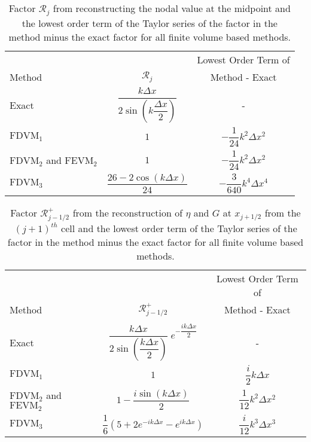 \begin{table}
	\centering
	\begin{tabular}{l  c  c}
		&&Lowest Order Term of	\\
		Method& $\mathcal{R}_j$& Method - Exact  \B \\
		\hline 
		Exact &$\dfrac{k\Delta x}{2 \sin \left(k\dfrac{\Delta x}{2}\right)}$ & - \T \B \\
		$\text{FDVM}_1$ & $1$ & $-\dfrac{1}{24}k^2 \Delta x^2$ \T \B \\
		$\text{FDVM}_2$ and $\text{FEVM}_2$& $1$ & $-\dfrac{1}{24}k^2 \Delta x^2$ \T \B \\
		$\text{FDVM}_3$& $\dfrac{26 - 2 \cos\left(k \Delta x\right)}{24}$ & $-\dfrac{3}{640}k^4 \Delta x^4$ \T \B  \\
		\hline	\end{tabular}
	\caption{Factor $\mathcal{R}_j$ from reconstructing the nodal value at the midpoint and the lowest order term of the Taylor series of the factor in the method minus the exact factor for all finite volume based methods.}
	\label{tab:Mfactor}
\end{table}
\begin{table}
	\centering
	\begin{tabular}{l  c  c}
		&&Lowest Order Term of	\\
		Method & $\mathcal{R}^+_{j-1/2}$ & Method - Exact \B\\
		\hline \\
		Exact & $\dfrac{k\Delta x}{2 \sin\left(\dfrac{k \Delta x}{2}\right)}\; e^{-\dfrac{ik\Delta x}{2}}$ & -   \T\B\\
		$\text{FDVM}_1$ & $1$ & $\dfrac{i}{2}k \Delta x$ \T\B \\
		$\text{FDVM}_2$ and $\text{FEVM}_2$& $ 1 - \dfrac{i \sin\left(k\Delta x \right)}{2}$ & $\dfrac{1}{12}k^2 \Delta x^2$  \T\B\\
		$\text{FDVM}_3$& $\dfrac{1}{6}\left({5 + 2e^{-i k {\Delta x}} - e^{i k {\Delta x}}} \right)$ & $\dfrac{i}{12}k^3 \Delta x^3$  \T\B \\
		\hline
	\end{tabular}
	\caption{Factor $\mathcal{R}^+_{j-1/2}$ from the reconstruction of $\eta$ and $G$ at $x_{j+1/2}$ from the ${(j+1)^{th}}$ cell and the lowest order term of the Taylor series of the factor in the method minus the exact factor for all finite volume based methods. }
	\label{tab:Rpfactor}
\end{table}
